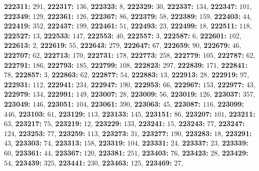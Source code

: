 \textsf{\bfseries 222311:} $291$, \textsf{\bfseries 222317:} $136$, \textsf{\bfseries 222323:} $8$, \textsf{\bfseries 222329:} $30$, \textsf{\bfseries 222337:} $134$, \textsf{\bfseries 222347:} $101$, \textsf{\bfseries 222349:} $129$, \textsf{\bfseries 222361:} $126$, \textsf{\bfseries 222367:} $86$, \textsf{\bfseries 222379:} $58$, \textsf{\bfseries 222389:} $159$, \textsf{\bfseries 222403:} $44$, \textsf{\bfseries 222419:} $352$, \textsf{\bfseries 222437:} $199$, \textsf{\bfseries 222461:} $51$, \textsf{\bfseries 222493:} $23$, \textsf{\bfseries 222499:} $18$, \textsf{\bfseries 222511:} $118$, \textsf{\bfseries 222527:} $13$, \textsf{\bfseries 222533:} $147$, \textsf{\bfseries 222553:} $40$, \textsf{\bfseries 222557:} $3$, \textsf{\bfseries 222587:} $6$, \textsf{\bfseries 222601:} $102$, \textsf{\bfseries 222613:} $2$, \textsf{\bfseries 222619:} $55$, \textsf{\bfseries 222643:} $279$, \textsf{\bfseries 222647:} $67$, \textsf{\bfseries 222659:} $90$, \textsf{\bfseries 222679:} $46$, \textsf{\bfseries 222707:} $62$, \textsf{\bfseries 222713:} $170$, \textsf{\bfseries 222731:} $178$, \textsf{\bfseries 222773:} $258$, \textsf{\bfseries 222779:} $105$, \textsf{\bfseries 222787:} $62$, \textsf{\bfseries 222791:} $186$, \textsf{\bfseries 222793:} $185$, \textsf{\bfseries 222799:} $108$, \textsf{\bfseries 222823:} $297$, \textsf{\bfseries 222839:} $171$, \textsf{\bfseries 222841:} $78$, \textsf{\bfseries 222857:} $3$, \textsf{\bfseries 222863:} $62$, \textsf{\bfseries 222877:} $54$, \textsf{\bfseries 222883:} $13$, \textsf{\bfseries 222913:} $28$, \textsf{\bfseries 222919:} $97$, \textsf{\bfseries 222931:} $112$, \textsf{\bfseries 222941:} $234$, \textsf{\bfseries 222947:} $190$, \textsf{\bfseries 222953:} $66$, \textsf{\bfseries 222967:} $153$, \textsf{\bfseries 222977:} $43$, \textsf{\bfseries 222979:} $134$, \textsf{\bfseries 222991:} $149$, \textsf{\bfseries 223007:} $28$, \textsf{\bfseries 223009:} $56$, \textsf{\bfseries 223019:} $126$, \textsf{\bfseries 223037:} $357$, \textsf{\bfseries 223049:} $146$, \textsf{\bfseries 223051:} $104$, \textsf{\bfseries 223061:} $390$, \textsf{\bfseries 223063:} $45$, \textsf{\bfseries 223087:} $116$, \textsf{\bfseries 223099:} $446$, \textsf{\bfseries 223103:} $61$, \textsf{\bfseries 223129:} $113$, \textsf{\bfseries 223133:} $145$, \textsf{\bfseries 223151:} $86$, \textsf{\bfseries 223207:} $101$, \textsf{\bfseries 223211:} $63$, \textsf{\bfseries 223217:} $75$, \textsf{\bfseries 223219:} $12$, \textsf{\bfseries 223229:} $133$, \textsf{\bfseries 223241:} $15$, \textsf{\bfseries 223243:} $77$, \textsf{\bfseries 223247:} $124$, \textsf{\bfseries 223253:} $77$, \textsf{\bfseries 223259:} $113$, \textsf{\bfseries 223273:} $31$, \textsf{\bfseries 223277:} $190$, \textsf{\bfseries 223283:} $18$, \textsf{\bfseries 223291:} $43$, \textsf{\bfseries 223303:} $74$, \textsf{\bfseries 223313:} $158$, \textsf{\bfseries 223319:} $104$, \textsf{\bfseries 223331:} $24$, \textsf{\bfseries 223337:} $23$, \textsf{\bfseries 223339:} $60$, \textsf{\bfseries 223361:} $44$, \textsf{\bfseries 223367:} $120$, \textsf{\bfseries 223381:} $251$, \textsf{\bfseries 223403:} $76$, \textsf{\bfseries 223423:} $28$, \textsf{\bfseries 223429:} $54$, \textsf{\bfseries 223439:} $325$, \textsf{\bfseries 223441:} $230$, \textsf{\bfseries 223463:} $125$, \textsf{\bfseries 223469:} $27$, 
